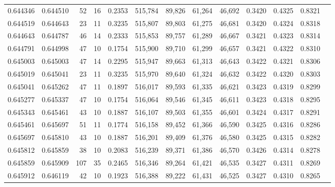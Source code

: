 \begin{tabular}{rrrrrrrrrrrrr}
0.644346 & 0.644510 &    52 &  16 &                                     0.2353 & 515,784 &  89,826 &  61,264 &  46,692 & 0.3420 & 0.4325 & 0.8321 \\
0.644519 & 0.644643 &    23 &  11 &                                     0.3235 & 515,807 &  89,803 &  61,275 &  46,681 & 0.3420 & 0.4324 & 0.8318 \\
0.644643 & 0.644787 &    46 &  14 &                                     0.2333 & 515,853 &  89,757 &  61,289 &  46,667 & 0.3421 & 0.4323 & 0.8314 \\
0.644791 & 0.644998 &    47 &  10 &                                     0.1754 & 515,900 &  89,710 &  61,299 &  46,657 & 0.3421 & 0.4322 & 0.8310 \\
0.645003 & 0.645003 &    47 &  14 &                                     0.2295 & 515,947 &  89,663 &  61,313 &  46,643 & 0.3422 & 0.4321 & 0.8306 \\
0.645019 & 0.645041 &    23 &  11 &                                     0.3235 & 515,970 &  89,640 &  61,324 &  46,632 & 0.3422 & 0.4320 & 0.8303 \\
0.645041 & 0.645262 &    47 &  11 &                                     0.1897 & 516,017 &  89,593 &  61,335 &  46,621 & 0.3423 & 0.4319 & 0.8299 \\
0.645277 & 0.645337 &    47 &  10 &                                     0.1754 & 516,064 &  89,546 &  61,345 &  46,611 & 0.3423 & 0.4318 & 0.8295 \\
0.645343 & 0.645461 &    43 &  10 &                                     0.1887 & 516,107 &  89,503 &  61,355 &  46,601 & 0.3424 & 0.4317 & 0.8291 \\
0.645461 & 0.645697 &    51 &  11 &                                     0.1774 & 516,158 &  89,452 &  61,366 &  46,590 & 0.3425 & 0.4316 & 0.8286 \\
0.645697 & 0.645810 &    43 &  10 &                                     0.1887 & 516,201 &  89,409 &  61,376 &  46,580 & 0.3425 & 0.4315 & 0.8282 \\
0.645812 & 0.645859 &    38 &  10 &                                     0.2083 & 516,239 &  89,371 &  61,386 &  46,570 & 0.3426 & 0.4314 & 0.8278 \\
0.645859 & 0.645909 &   107 &  35 &                                     0.2465 & 516,346 &  89,264 &  61,421 &  46,535 & 0.3427 & 0.4311 & 0.8269 \\
0.645912 & 0.646119 &    42 &  10 &                                     0.1923 & 516,388 &  89,222 &  61,431 &  46,525 & 0.3427 & 0.4310 & 0.8265 \\

\end{tabular}
